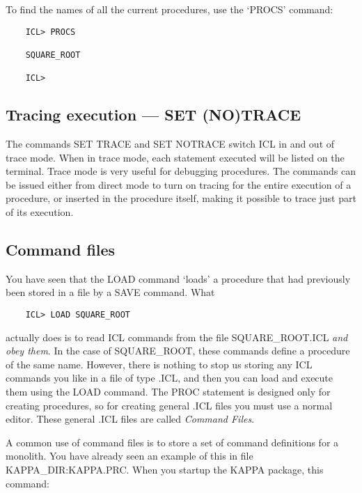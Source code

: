 To find the names of all the current procedures, use the `PROCS' command:

\begin{small}
\begin{verbatim}
    ICL> PROCS

    SQUARE_ROOT

    ICL> 
\end{verbatim}
\end{small}


\subsection{Tracing execution --- SET (NO)TRACE}

The commands SET TRACE and SET NOTRACE switch ICL in and out of trace mode.
When in trace mode, each statement executed will be listed on the terminal.
Trace mode is very useful for debugging procedures.
The commands can be issued either from direct mode to turn on tracing for the
entire execution of a procedure, or inserted in the procedure itself, making
it possible to trace just part of its execution.

\subsection{Command files}

You have seen that the LOAD command `loads' a procedure that had previously
been stored in a file by a SAVE command.
What

\begin{small}
\begin{verbatim}
    ICL> LOAD SQUARE_ROOT
\end{verbatim}
\end{small}

actually does is to read ICL commands from the file SQUARE\_ROOT.ICL
{\em and obey them}.
In the case of SQUARE\_ROOT, these commands define a procedure of the same
name.
However, there is nothing to stop us storing any ICL commands you like in a
file of type .ICL, and then you can load and execute them using the LOAD
command.
The PROC statement is designed only for creating procedures, so for creating
general .ICL files you must use a normal editor.
These general .ICL files are called {\em Command Files}.

A common use of command files is to store a set of command definitions
for a monolith.
You have already seen an example of this in file KAPPA\_DIR:KAPPA.PRC.
When you startup the KAPPA package, this command:

